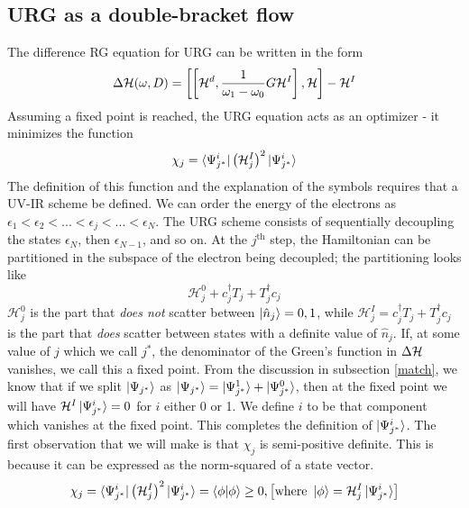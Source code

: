 \documentclass[12pt,twoside]{article}
\numberwithin{equation}{section}
\begin{document}
{\subsection{URG as a double-bracket flow}
The difference RG equation for URG can be written in the form
\begin{equation}
	\Delta \mathcal{H} (\omega,D) =  \left[\left[ \mathcal{H}^d, \frac{1}{\omega_1 - \omega_0}G\mathcal{H}^I\right],\mathcal{H}\right] - \mathcal{H}^I\\
\end{equation}
Assuming a fixed point is reached, the URG equation acts as an optimizer - it minimizes the function
\begin{equation}
\chi_j = \bra{\Psi^i_{j^*}}\left(\mathcal{H}^I_j\right)^2\ket{\Psi^i_{j^*}}
\end{equation}
The definition of this function and the explanation of the symbols requires that a UV-IR scheme be defined. We can order the energy of the electrons as \(\epsilon_1 < \epsilon_2 < ... < \epsilon_j < ... < \epsilon_N\). The URG scheme consists of sequentially decoupling the states \(\epsilon_N\), then \(\epsilon_{N-1}\), and so on. At the \(j^\text{th}\) step, the Hamiltonian can be partitioned in the subspace of the electron being decoupled; the partitioning looks like
\begin{equation}
	\mathcal{H}^0_j + c_j^\dagger T_j + T_j^\dagger c_j
\end{equation}
\(\mathcal{H}^0_j\) is the part that \textit{does not} scatter between \(\ket{\hat n_j} = 0,1\), while \(\mathcal{H}^I_j = c_j^\dagger T_j + T_j^\dagger c_j\) is the part that \textit{does} scatter between states with a definite value of \(\hat n_j\). If, at some value of \(j\) which we call \(j^*\), the denominator of the Green's function in \(\Delta \mathcal{H}\) vanishes, we call this a fixed point. From the discussion in subsection \ref{match}, we know that if we split \(\ket{\Psi_{j^*}}\) as \(\ket{\Psi_{j^*}} =\ket{\Psi^1_{j^*}}+\ket{\Psi^0_{j^*}}\), then at the fixed point we will have \(\mathcal{H}^I \ket{\Psi^i_{j^*}} = 0\) for \(i\) either 0 or 1. We define \(i\) to be that component which vanishes at the fixed point. This completes the definition of \(\ket{\Psi^i_{j^*}}\).
\pb The first observation that we will make is that \(\chi_j\) is semi-positive definite. This is because it can be expressed as the norm-squared of a state vector.
\begin{equation}
	\chi_j = \bra{\Psi^i_{j^*}}\left(\mathcal{H}^I_j\right)^2\ket{\Psi^i_{j^*}} = \langle\phi | \phi \rangle \geq 0, \left[\text{where }\ket{\phi} = \mathcal{H}^I_j\ket{\Psi^i_{j^*}}\right]

\end{equation}}
\end{document}
